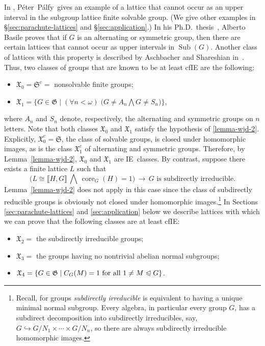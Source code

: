 \documentclass{gen-j-l}
\newcommand{\lb}{\ensuremath{\llbracket}}
\newcommand{\rb}{\ensuremath{\rrbracket}}
\newcommand{\<}{\ensuremath{\langle}}
\renewcommand{\>}{\ensuremath{\rangle}}
\theoremstyle{plain}
\theoremstyle{definition}
\theoremstyle{remark}
\numberwithin{theorem}{section}
\numberwithin{claim}{section}
\numberwithin{equation}{section}
\numberwithin{conjecture}{section}
\newcommand{\Peter}{P{\'e}ter}
\newcommand{\Palfy}{P\'alfy}
\newcommand{\defn}[1]{\emph{#1}}
\newcommand{\subnormal}{\ensuremath{\trianglelefteqslant}}
\newcommand{\Meet}{\ensuremath{\bigwedge}}
\newcommand{\Sub}{\ensuremath{\operatorname{Sub}}}
\newcommand{\core}{\ensuremath{\operatorname{core}}}
\newcommand{\2}{\ensuremath{\mathbf{2}}}
\newcommand{\3}{\ensuremath{\mathbf{3}}}
\newcommand{\sG}{\ensuremath{\mathfrak{X}}}
\newcommand{\G}{\ensuremath{\mathfrak{G}}}
\newcommand{\IE}{{\small IE}}
\begin{document}
In \cite{Palfy:1995}, \Peter\ \Palfy\ gives an example of a lattice that cannot occur as an
upper interval in the subgroup lattice finite solvable group.  (We give other examples
in \S\ref{sec:parachute-lattices} and \S\ref{sec:application}.)
In his Ph.D.~thesis~\cite{Basile:2001}, Alberto Basile proves that if
$G$ is an alternating or symmetric group, then there are certain lattices that
cannot occur as upper intervals in $\Sub(G)$. Another class of lattices with
this property is described by Aschbacher and Shareshian in~\cite{Aschbacher:2009}. 
Thus, two classes of groups that are known to be at least \acs{cfIE} are the following:
\begin{itemize}
\item $\sG_0 = \mathfrak{S}^c = $ nonsolvable finite groups;
\item $\sG_1 =\bigl\{G\in \G \mid (\forall n<\omega) \; \bigl(G \neq A_n \Meet  G\neq S_n\bigr) \bigr\}$,
\end{itemize}
where $A_n$ and $S_n$ denote, respectively,
the alternating and symmetric groups on
$n$ letters.
Note that both classes $\sG_0$ and $\sG_1$ satisfy the hypothesis of \ref{lemma-wjd-2}.
Explicitly, $\sG_0^c = \mathfrak{S}$, the class of solvable groups, is closed under homomorphic
images, as is the class $\sG_1^c$ of alternating and symmetric groups. 
Therefore, by Lemma~\ref{lemma-wjd-2}, $\sG_0$ and $\sG_1$ are \IE\ classes.
By contrast, suppose %
there exists a finite lattice $L$ such that
 \[
 \bigl(L \cong \lb H, G \rb \,\Meet\, \core_G(H)=1\bigr) \, \longrightarrow \, G
 \text{ is subdirectly irreducible.}  %
\]
Lemma~\ref{lemma-wjd-2} does not apply in this case since the class of
subdirectly reducible groups is obviously not closed under homomorphic 
images.\footnote{Recall, for groups \defn{subdirectly irreducible} is equivalent
  to having a unique minimal normal subgroup.
 Every algebra, in particular every group $G$, has a subdirect
  decomposition into subdirectly irreducibles, say, $G\hookrightarrow G/N_1 \times \cdots\times
  G/N_n$, so there are always  subdirectly irreducible homomorphic images.}
In Sections \ref{sec:parachute-lattices} and \ref{sec:application} below we describe
lattices with which we can prove that the following classes are at least 
\acs{cfIE}: 
\begin{itemize}
\item $\sG_2 = $ the subdirectly irreducible groups;
\item $\sG_3 = $ the groups having no nontrivial abelian normal subgroups;
\item $\sG_4 = \{G\in \G \mid C_G(M) = 1 \text{ for all } 1\neq M\subnormal G\}$.
\end{itemize}
\end{document}

